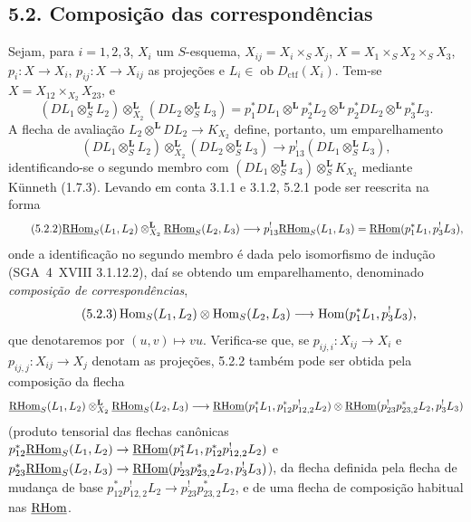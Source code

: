 \subsection*{5.2. Composição das correspondências}

Sejam, para $i=1,2,3$, $X_i$ um $S$-esquema, $X_{ij}=X_i\times_SX_j$, $X=X_1\times_SX_2\times_SX_3$, $p_i:X\to X_i$, $p_{ij}:X\to X_{ij}$ as projeções e $L_i\in\operatorname{ob}D_{\mathrm{ctf}}(X_i)$. Tem-se $X=X_{12}\times_{X_2}X_{23}$, e
\[
(DL_1\otimes_S^{\mathbf L}L_2)\otimes_{X_2}^{\mathbf L}(DL_2\otimes_S^{\mathbf L}L_3)
=p_1^*DL_1\otimes^{\mathbf L}p_2^*L_2\otimes^{\mathbf L}p_2^*DL_2\otimes^{\mathbf L}p_3^*L_3.
\]
A flecha de avaliação $L_2\otimes^{\mathbf L}DL_2\to K_{X_2}$ define, portanto, um emparelhamento
\begin{equation}
\tag{5.2.1}
(DL_1\otimes_S^{\mathbf L}L_2)\otimes_{X_2}^{\mathbf L}(DL_2\otimes_S^{\mathbf L}L_3)\longrightarrow p_{13}^!(DL_1\otimes_S^{\mathbf L}L_3),
\end{equation}
identificando-se o segundo membro com $(DL_1\otimes_S^{\mathbf L}L_3)\otimes_S^{\mathbf L}K_{X_2}$ mediante Künneth (1.7.3). Levando em conta 3.1.1 e 3.1.2, 5.2.1 pode ser reescrita na forma
\begin{equation}
\tag{5.2.2}
\underline{\mathrm{RHom}}_S(L_1,L_2)\otimes_{X_2}^{\mathbf L}\underline{\mathrm{RHom}}_S(L_2,L_3)\longrightarrow p_{13}^!\underline{\mathrm{RHom}}_S(L_1,L_3)=\underline{\mathrm{RHom}}(p_1^*L_1,p_3^!L_3),
\end{equation}
onde a identificação no segundo membro é dada pelo isomorfismo de indução (SGA~4~XVIII 3.1.12.2), daí se obtendo um emparelhamento, denominado \emph{composição de correspondências},
\begin{equation}
\tag{5.2.3}
\operatorname{Hom}_S(L_1,L_2)\otimes\operatorname{Hom}_S(L_2,L_3)\longrightarrow\operatorname{Hom}(p_1^*L_1,p_3^!L_3),
\end{equation}
que denotaremos por $(u,v)\mapsto vu$. Verifica-se que, se $p_{ij,i}:X_{ij}\to X_i$ e $p_{ij,j}:X_{ij}\to X_j$ denotam as projeções, 5.2.2 também pode ser obtida pela composição da flecha
\[
\underline{\mathrm{RHom}}_S(L_1,L_2)\otimes_{X_2}^{\mathbf L}\underline{\mathrm{RHom}}_S(L_2,L_3)
\longrightarrow
\underline{\mathrm{RHom}}(p_1^*L_1,p_{12}^*p_{12,2}^!L_2)
\otimes
\underline{\mathrm{RHom}}(p_{23}^!p_{23,2}^*L_2,p_3^!L_3)
\]
(produto tensorial das flechas canônicas $p_{12}^*\underline{\mathrm{RHom}}_S(L_1,L_2)\to\underline{\mathrm{RHom}}(p_1^*L_1,p_{12}^*p_{12,2}^!L_2)$ e $p_{23}^*\underline{\mathrm{RHom}}_S(L_2,L_3)\to\underline{\mathrm{RHom}}(p_{23}^!p_{23,2}^*L_2,p_3^!L_3)$), da flecha definida pela flecha de mudança de base $p_{12}^*p_{12,2}^!L_2\to p_{23}^!p_{23,2}^*L_2$, e de uma flecha de composição habitual nas $\underline{\mathrm{RHom}}$.

